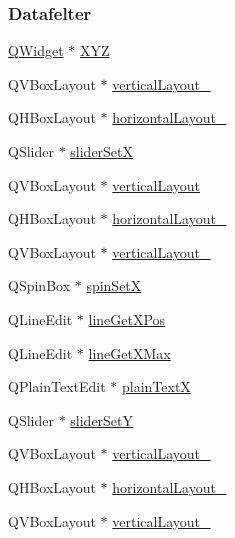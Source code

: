 \subsubsection*{Datafelter}
\begin{DoxyCompactItemize}
\item 
\hyperlink{class_q_widget}{Q\+Widget} $\ast$ \hyperlink{class_ui___e3_p_j_r_a098a80b873d9e0a09fd834f09e5028b4}{X\+YZ}
\item 
Q\+V\+Box\+Layout $\ast$ \hyperlink{class_ui___e3_p_j_r_a7c00a0b53a83fa0709131b996a6249a9}{vertical\+Layout\+\_}
\item 
Q\+H\+Box\+Layout $\ast$ \hyperlink{class_ui___e3_p_j_r_af1b2167ad3027fe2c2328701164e54ec}{horizontal\+Layout\+\_}
\item 
Q\+Slider $\ast$ \hyperlink{class_ui___e3_p_j_r_ac45c355780da0c571a472ccb5f74c977}{slider\+SetX}
\item 
Q\+V\+Box\+Layout $\ast$ \hyperlink{class_ui___e3_p_j_r_ad85f9339d941aa92fe82db7dcba6664c}{vertical\+Layout}
\item 
Q\+H\+Box\+Layout $\ast$ \hyperlink{class_ui___e3_p_j_r_aeb3eff1a8b0673c92f1ed957263d272b}{horizontal\+Layout\+\_}
\item 
Q\+V\+Box\+Layout $\ast$ \hyperlink{class_ui___e3_p_j_r_a123f4222372065593b6a3433ac1dde9d}{vertical\+Layout\+\_}
\item 
Q\+Spin\+Box $\ast$ \hyperlink{class_ui___e3_p_j_r_ab782845855d3c29e2d229ff09b717771}{spin\+SetX}
\item 
Q\+Line\+Edit $\ast$ \hyperlink{class_ui___e3_p_j_r_a2aa996a4bf178178f8c776bd139e1e98}{line\+Get\+X\+Pos}
\item 
Q\+Line\+Edit $\ast$ \hyperlink{class_ui___e3_p_j_r_aa70a702ff832048eb7b3a06560b1cccd}{line\+Get\+X\+Max}
\item 
Q\+Plain\+Text\+Edit $\ast$ \hyperlink{class_ui___e3_p_j_r_ac06b3dba512fbdc4436a33323fd6e737}{plain\+TextX}
\item 
Q\+Slider $\ast$ \hyperlink{class_ui___e3_p_j_r_afc14eb4b41f896c3881b1f3f86ebb5ab}{slider\+SetY}
\item 
Q\+V\+Box\+Layout $\ast$ \hyperlink{class_ui___e3_p_j_r_a1f81b7e95162efcbe551b64ca41869c8}{vertical\+Layout\+\_}
\item 
Q\+H\+Box\+Layout $\ast$ \hyperlink{class_ui___e3_p_j_r_a9200504b29bbbfa17f9e6aefafc2c122}{horizontal\+Layout\+\_}
\item 
Q\+V\+Box\+Layout $\ast$ \hyperlink{class_ui___e3_p_j_r_a6846ec6f18ab0ea13bdb2d00b2cb3947}{vertical\+Layout\+\_}

\end{DoxyCompactItemize}
